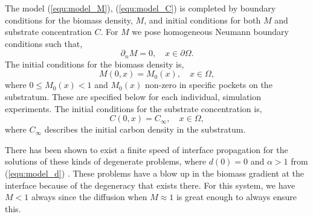 The model (\ref{equ:model_M}), (\ref{equ:model_C}) is completed by boundary conditions for the biomass density, $M$, and initial conditions for both $M$ and substrate concentration $C$.
For $M$ we pose homogeneous Neumann boundary conditions such that,
\begin{equation} 
  \partial_n M = 0, \quad x \in \partial \Omega.
\end{equation}
The initial conditions for the biomass density is,
\begin{equation}
  M(0,x) = M_0(x), \quad x \in \Omega,
\end{equation}
where $0 \le M_0(x) < 1$ and $M_0(x)$ non-zero in specific pockets on the substratum. 
These are specified below for each individual, simulation experiments.
The initial conditions for the substrate concentration is,
\begin{equation}
  C(0,x) = C_{\infty}, \quad x \in \Omega,
\end{equation}
where $C_{\infty}$ describes the initial carbon density in the substratum.

There has been shown to exist a finite speed of interface propagation for the solutions of these kinds of degenerate problems, where $d(0) = 0$ and $\alpha >1$ from (\ref{equ:model_d}) \citep{jalbert2014numerical}.
These problems have a blow up in the biomass gradient at the interface because of the degeneracy that exists there.
For this system, we have $M < 1$ always since the diffusion when $M \approx 1$ is great enough to always ensure this.

